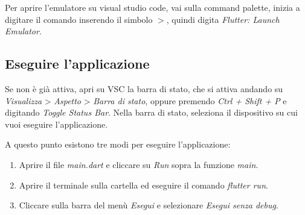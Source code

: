 \documentclass[12pt]{article}
\begin{document}
Per aprire l'emulatore su visual studio code,
vai sulla command palette, inizia a digitare il comando inserendo il simbolo 
$>$, quindi digita \textit{Flutter: Launch Emulator}.

\subsection{Eseguire l'applicazione}
Se non è già attiva, apri su VSC la barra di stato, che 
si attiva andando su \textit{Visualizza} > \textit{Aspetto} > \textit{Barra di stato},
oppure premendo \textit{Ctrl + Shift + P} e digitando \textit{Toggle Status Bar}.
Nella barra di stato, seleziona il dispositivo su cui vuoi 
eseguire l'applicazione.

A questo punto esistono tre modi per eseguire l'applicazione:
\begin{enumerate}
    \item Aprire il file \textit{main.dart} e cliccare su \textit{Run} sopra 
    la funzione \textit{main}.
    \item Aprire il terminale sulla cartella ed eseguire il comando 
    \textit{flutter run}.
    \item Cliccare sulla barra del menù \textit{Esegui} e selezionare
    \textit{Esegui senza debug}.
\end{enumerate}
\end{document}
